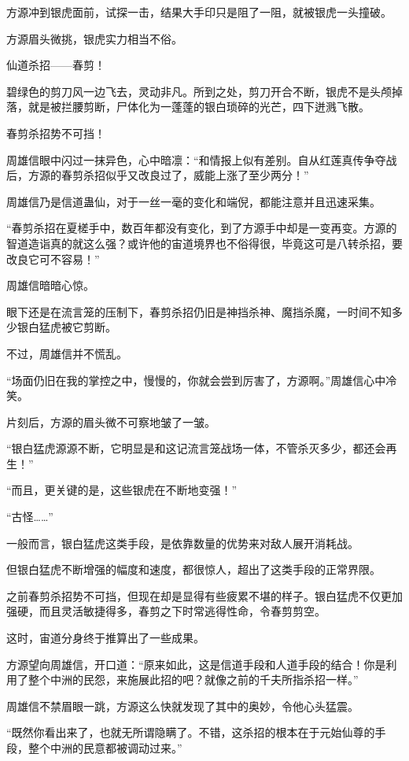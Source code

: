 \begin{this_body}
方源冲到银虎面前，试探一击，结果大手印只是阻了一阻，就被银虎一头撞破。

方源眉头微挑，银虎实力相当不俗。

仙道杀招——春剪！

碧绿色的剪刀风一边飞去，灵动非凡。所到之处，剪刀开合不断，银虎不是头颅掉落，就是被拦腰剪断，尸体化为一蓬蓬的银白琐碎的光芒，四下迸溅飞散。

春剪杀招势不可挡！

周雄信眼中闪过一抹异色，心中暗凛：“和情报上似有差别。自从红莲真传争夺战后，方源的春剪杀招似乎又改良过了，威能上涨了至少两分！”

周雄信乃是信道蛊仙，对于一丝一毫的变化和端倪，都能注意并且迅速采集。

“春剪杀招在夏槎手中，数百年都没有变化，到了方源手中却是一变再变。方源的智道造诣真的就这么强？或许他的宙道境界也不俗得很，毕竟这可是八转杀招，要改良它可不容易！”

周雄信暗暗心惊。

眼下还是在流言笼的压制下，春剪杀招仍旧是神挡杀神、魔挡杀魔，一时间不知多少银白猛虎被它剪断。

不过，周雄信并不慌乱。

“场面仍旧在我的掌控之中，慢慢的，你就会尝到厉害了，方源啊。”周雄信心中冷笑。

片刻后，方源的眉头微不可察地皱了一皱。

“银白猛虎源源不断，它明显是和这记流言笼战场一体，不管杀灭多少，都还会再生！”

“而且，更关键的是，这些银虎在不断地变强！”

“古怪……”

一般而言，银白猛虎这类手段，是依靠数量的优势来对敌人展开消耗战。

但银白猛虎不断增强的幅度和速度，都很惊人，超出了这类手段的正常界限。

之前春剪杀招势不可挡，但现在却是显得有些疲累不堪的样子。银白猛虎不仅更加强硬，而且灵活敏捷得多，春剪之下时常逃得性命，令春剪剪空。

这时，宙道分身终于推算出了一些成果。

方源望向周雄信，开口道：“原来如此，这是信道手段和人道手段的结合！你是利用了整个中洲的民怨，来施展此招的吧？就像之前的千夫所指杀招一样。”

周雄信不禁眉眼一跳，方源这么快就发现了其中的奥妙，令他心头猛震。

“既然你看出来了，也就无所谓隐瞒了。不错，这杀招的根本在于元始仙尊的手段，整个中洲的民意都被调动过来。”


\end{this_body}
